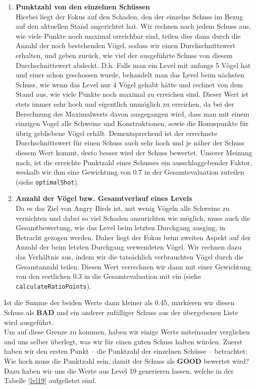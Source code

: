 \begin{table}[H]
\begin{enumerate}
\item \textbf{Punktzahl von den einzelnen Schüssen} \\
Hierbei liegt der Fokus auf den Schaden, den der einzelne Schuss im Bezug auf den aktuellen Stand angerichtet hat. Wir rechnen nach jedem Schuss aus, wie viele Punkte noch maximal erreichbar sind, teilen dies dann durch die Anzahl der noch bestehenden Vögel, sodass wir einen Durchschnittswert erhalten, und geben zurück, wie viel der ausgeführte Schuss von diesem Durchschnittswert abdeckt. D.h. Falls man ein Level mit anfangs 5 Vögel hat und einer schon geschossen wurde, behandelt man das Level beim nächsten Schuss, wie wenn das Level nur 4 Vögel gehabt hätte und rechnet von dem Stand aus, wie viele Punkte noch maximal zu erreichen sind. Dieser Wert ist stets immer sehr hoch und eigentlich unmöglich zu erreichen, da bei der Berechnung des Maximalwerts davon ausgegangen wird, dass man mit einem einzigen Vogel alle Schweine und Konstruktionen, sowie die Bonuspunkte für übrig gebliebene Vögel erhält. Dementsprechend ist der errechnete Durchschnittswert für einen Schuss auch sehr hoch und je näher der Schuss diesem Wert kommt, desto besser wird der Schuss bewertet. Unserer Meinung nach, ist die erreichte Punktzahl eines Schusses ein ausschlaggebender Faktor, weshalb wir ihm eine Gewichtung von 0.7 in der Gesamtevaluation zuteilen (siehe \texttt{optimalShot}). \\
\item \textbf{Anzahl der Vögel bzw. Gesamtverlauf eines Levels} \\
Da es das Ziel von Angry Birds ist, mit wenig Vögeln alle Schweine zu vernichten und dabei so viel Schaden anzurichten wie möglich, muss auch die Gesamtbewertung, wie das Level beim letzten Durchgang ausging, in Betracht gezogen werden. Daher liegt der Fokus beim zweiten Aspekt auf der Anzahl der beim letzten Durchgang verwendeten Vögel. Wir rechnen dazu das Verhältnis aus, indem wir die tatsächlich verbrauchten Vögel durch die Gesamtanzahl teilen. Diesen Wert verrechnen wir dann mit einer Gewichtung von den restlichen 0.3 in die Gesamtevaluation mit ein (siehe \texttt{calculateRatioPoints}).
\end{enumerate}
\end{table}

Ist die Summe der beiden Werte dann kleiner als 0.45, markieren wir diesen Schuss als \textbf{BAD} und ein anderer zufälliger Schuss aus der übergebenen Liste wird ausgeführt.\\
Um auf diese Grenze zu kommen, haben wir einige Werte miteinander verglichen und uns selber überlegt, was wir für einen guten Schuss halten würden. Zuerst haben wir den ersten Punkt -- die Punktzahl der einzelnen Schüsse -- betrachtet: Wie hoch muss die Punktzahl sein, damit der Schuss als \textbf{GOOD} bewertet wird? Dazu haben wir uns die Werte aus Level 19 generieren lassen, welche in der Tabelle \ref{lvl19} aufgelistet sind.

